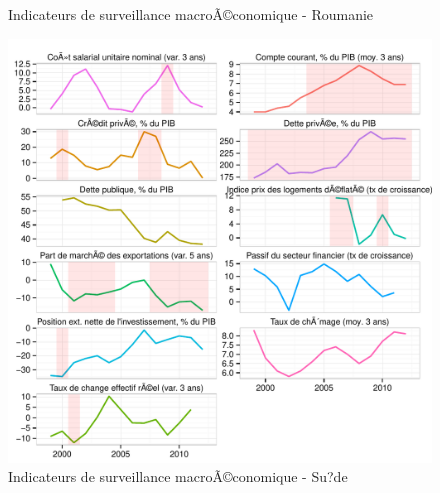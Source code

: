 \documentclass{article}\usepackage[]{graphicx}\usepackage[]{color}
\makeatletter
\def\maxwidth{ %
  \ifdim\Gin@nat@width>\linewidth
    \linewidth
  \else
    \Gin@nat@width
  \fi
}
\newenvironment{knitrout}{}{} %
\makeatother
\begin{document}
\begin{knitrout}
\begin{figure}[p]
{}

\caption[Indicateurs de surveillance macroÃ©conomique - Roumanie]{Indicateurs de surveillance macroÃ©conomique - Roumanie\label{fig:byco24}}
\end{figure}

\begin{figure}[p]


{\centering \includegraphics[width=\maxwidth]{figure_graph/byco25} 

}

\caption[Indicateurs de surveillance macroÃ©conomique - Su?de]{Indicateurs de surveillance macroÃ©conomique - Su?de\label{fig:byco25}}
\end{figure}

\begin{figure}[p]



\end{figure}
\end{knitrout}
\end{document}
